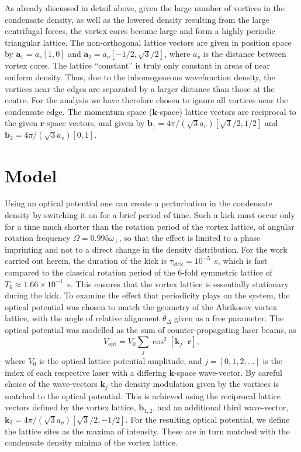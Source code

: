 As already discussed in detail above, given the large number of vortices in the condensate density, as well as the lowered density resulting from the large centrifugal forces, the vortex cores become large and form a highly periodic triangular lattice. The non-orthogonal lattice vectors are given in position space by $\mathbf{a}_1 = a_v[1,0]$ and $\mathbf{a}_2 = a_v[-1/2, \sqrt{3}/2]$, where $a_v$ is the distance between vortex cores. The lattice ``constant'' is truly only constant in areas of near uniform density. Thus, due to the inhomogeneous wavefunction density, the vortices near the edges are separated by a larger distance than those at the centre. For the analysis we have therefore chosen to ignore all vortices near the condensate edge. The momentum space ($\mathbf{k}$-space) lattice vectors are reciprocal to the given $\mathbf{r}$-space vectors, and given by $\mathbf{b}_1 = 4\pi/(\sqrt{3}a_v)\left[\sqrt{3}/2,1/2\right]$ and $\mathbf{b}_2 = 4\pi/(\sqrt{3}a_v)\left[0,1\right]$.

\section{Model}

Using an optical potential one can create a perturbation in the condensate density by switching it on for a brief period of time. Such a kick must occur only for a time much shorter than the rotation period of the vortex lattice, of angular rotation frequency $\Omega = 0.995\omega_\perp$, so that the effect is limited to a phase imprinting and not to a direct change in the density distribution. For the work carried out herein, the duration of the kick is $\tau_{\text{kick}}=10^{-5}$~s, which is fast compared to the classical rotation period of the 6-fold symmetric lattice of $T_{6} \approx 1.66\times 10^{-1}$~s. This ensures that the vortex lattice is essentially stationary during the kick. To examine the effect that periodicity plays on the system, the optical potential was chosen to match the geometry of the Abrikosov vortex lattice, with the angle of relative alignment $\theta_\Delta$ given as a free parameter. The optical potential was modelled as the sum of counter-propagating laser beams, as
\begin{equation}
    V_{\text{opt}} = V_0\displaystyle\sum_{j}\cos^2 \left[ \textbf{k}_{j}\cdot\textbf{r} \right],
\end{equation}
where $V_0$ is the optical lattice potential amplitude, and $j=[0,1,2,\ldots ]$ is the index of each respective laser with a differing $\mathbf{k}$-space wave-vector. By careful choice of the wave-vectors $\textbf{k}_{j}$ the density modulation given by the vortices is matched to the optical potential. This is achieved using the reciprocal lattice vectors defined by the vortex lattice, $\mathbf{b}_{1,2}$, and an additional third wave-vector, $\mathbf{k}_3 = 4\pi/(\sqrt{3}a_o)\left[\sqrt{3}/2,-1/2\right]$. For the resulting optical potential, we define the lattice sites as the maxima of intensity. These are in turn matched with the condensate density minima of the vortex lattice.

